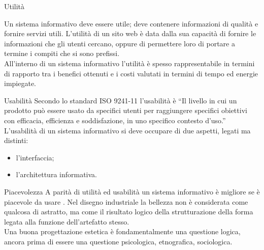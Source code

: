 \documentclass[pdf,mpa]{prosper}
\begin{document}
\begin{slide}{Utilità}

% 

Un sistema informativo deve essere utile; deve contenere informazioni di qualità e fornire servizi utili. L'utilità di un sito web è data dalla sua capacità di fornire le informazioni che gli utenti cercano, oppure di permettere loro di portare a termine i compiti che si sono prefissi.\\
All'interno di un sistema informativo l'utilità è spesso rappresentabile in termini di rapporto tra i benefici ottenuti e i costi valutati in termini di tempo ed energie impiegate.

\end{slide}

\begin{slide}{Usabilità}
Secondo lo standard ISO 9241-11 l'usabilità è ``Il livello in cui un prodotto può essere usato da specifici utenti per raggiungere specifici obiettivi con efficacia, efficienza e soddisfazione, in uno specifico contesto d'uso.''
L'usabilità di un sistema informativo si deve occupare di due aspetti, legati ma distinti:
\begin{itemize}
\item l'interfaccia;
\item l'architettura informativa.
\end{itemize}
\end{slide}

\begin{slide}{Piacevolezza}
A parità di utilità ed usabilità un sistema informativo è migliore se è piacevole da usare \citep{Busetti2003}.
Nel disegno industriale la bellezza non è considerata come qualcosa di astratto, ma come il risultato logico della strutturazione della forma legata alla funzione dell'artefatto stesso.\\

Una buona progettazione estetica è fondamentalmente una questione logica, ancora prima di essere una questione psicologica, etnografica, sociologica.



\end{slide}
\end{document}
